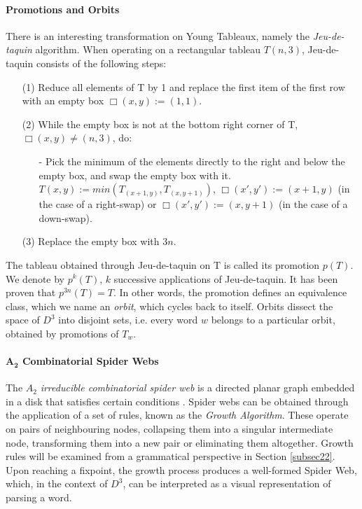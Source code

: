 \documentclass[nonatbib,numbers,10pt]{llncs}
\begin{document}
\paragraph{\textbf{Promotions and Orbits}}
There is an interesting transformation on Young Tableaux, namely the \textit{Jeu-de-taquin} algorithm. When operating on a rectangular tableau $T(n,3)$, Jeu-de-taquin consists of the following steps:
\begin{enumerate}
\item[(1)] Reduce all elements of T by 1 and replace the first item of the first row with an empty box $ \Box (x,y) := (1,1)$.
\item[(2)] While the empty box is not at the bottom right corner of T, $ \Box(x,y) \neq (n,3)$, do:
\begin{enumerate}
\item[-] Pick the minimum of the elements directly to the right and below the empty box, and swap the empty box with it. $ T(x, y) := min(T_{(x+1,y)}, T_{(x,y+1)})$, $ \Box (x',y') := (x+1, y)$ (in the case of a right-swap) or $\Box (x',y') := (x,y+1)$ (in the case of a down-swap).
\end{enumerate}
\item[(3)] Replace the empty box with $3n$.
\end{enumerate}

The tableau obtained through Jeu-de-taquin on T is called its promotion $p(T)$. We denote by $p^k(T)$, $k$ successive applications of Jeu-de-taquin. It has been proven that $p^{3n}(T)=T$\cite{haiman}. In other words, the promotion defines an equivalence class, which we name an \textit{orbit}, which cycles back to itself. Orbits dissect the space of $D^3$ into disjoint sets, i.e. every word $w$ belongs to a particular orbit, obtained by promotions of $T_w$.

\paragraph{\textbf{$\mathbf{A_2}$ Combinatorial Spider Webs}}
The $A_2$ \textit{irreducible combinatorial spider web} is a directed planar graph embedded in a disk that satisfies certain conditions \cite{kuperberg}. Spider webs can be obtained through the application of a set of rules, known as the \textit{Growth Algorithm}\cite{petersen}. These operate on pairs of neighbouring nodes, collapsing them into a singular intermediate node, transforming them into a new pair or eliminating them altogether. Growth rules will be examined from a grammatical perspective in Section \ref{subsec22}. Upon reaching a fixpoint, the growth process produces a well-formed Spider Web, which, in the context of $D^3$, can be interpreted as a visual representation of parsing a word\cite{moortgat,petersen}.
\end{document}
